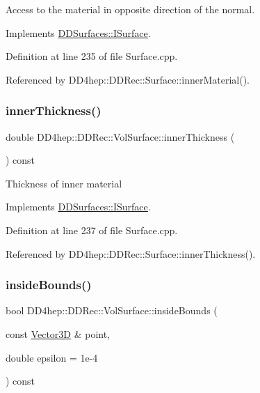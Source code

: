 Access to the material in opposite direction of the normal. 



Implements \hyperlink{class_d_d_surfaces_1_1_i_surface_a18942d2f0ea7478506765a50fa44d5e3}{D\+D\+Surfaces\+::\+I\+Surface}.



Definition at line 235 of file Surface.\+cpp.



Referenced by D\+D4hep\+::\+D\+D\+Rec\+::\+Surface\+::inner\+Material().

\hypertarget{class_d_d4hep_1_1_d_d_rec_1_1_vol_surface_a78818e330968041cb17c0694d380ff3f}{}\label{class_d_d4hep_1_1_d_d_rec_1_1_vol_surface_a78818e330968041cb17c0694d380ff3f} 
\subsubsection{\texorpdfstring{inner\+Thickness()}{innerThickness()}}
{\footnotesize\ttfamily double D\+D4hep\+::\+D\+D\+Rec\+::\+Vol\+Surface\+::inner\+Thickness (\begin{DoxyParamCaption}{ }\end{DoxyParamCaption}) const\hspace{0.3cm}{\ttfamily [virtual]}}

Thickness of inner material 

Implements \hyperlink{class_d_d_surfaces_1_1_i_surface_ab6913582dd6c1f44df2038705ce2aea6}{D\+D\+Surfaces\+::\+I\+Surface}.



Definition at line 237 of file Surface.\+cpp.



Referenced by D\+D4hep\+::\+D\+D\+Rec\+::\+Surface\+::inner\+Thickness().

\hypertarget{class_d_d4hep_1_1_d_d_rec_1_1_vol_surface_abb5047e09cf8ccb538b3f97766321c9e}{}\label{class_d_d4hep_1_1_d_d_rec_1_1_vol_surface_abb5047e09cf8ccb538b3f97766321c9e} 
\subsubsection{\texorpdfstring{inside\+Bounds()}{insideBounds()}}
{\footnotesize\ttfamily bool D\+D4hep\+::\+D\+D\+Rec\+::\+Vol\+Surface\+::inside\+Bounds (\begin{DoxyParamCaption}\item[{const \hyperlink{class_d_d_surfaces_1_1_vector3_d}{Vector3D} \&}]{point,  }\item[{double}]{epsilon = {\ttfamily 1e-\/4} }\end{DoxyParamCaption}) const\hspace{0.3cm}{\ttfamily [virtual]}}



